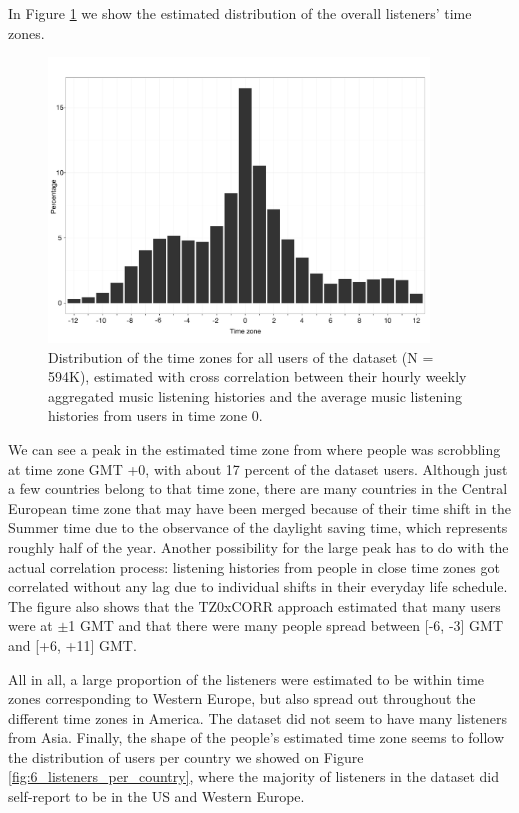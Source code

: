 In Figure \ref{fig:listenerstimezonebytz0weeklycorrelation} we show the estimated distribution of the overall listeners' time zones.	
\begin{figure}[!h]
\centering
\includegraphics[width = 0.9\textwidth]{listeners_tz_xcorr.pdf}
\caption[Distribution of the time zones for all users of the dataset]{Distribution of the time zones for all users of the dataset (N = 594K), estimated with cross correlation between their hourly weekly aggregated music listening histories and the average music listening histories from users in time zone 0.}
\label{fig:listenerstimezonebytz0weeklycorrelation}
\end{figure}
We can see a peak in the estimated time zone from where people was scrobbling at time zone GMT +0, with about 17 percent of the dataset users. Although just a few countries belong to that time zone, there are many countries in the Central European time zone that may have been merged because of their time shift in the Summer time due to the observance of the daylight saving time,  which represents roughly half of the year.
Another possibility for the large peak has to do with the actual correlation process: listening histories from people in close time zones got correlated without any lag due to individual shifts in their everyday life schedule.
The figure also shows that the TZ0xCORR approach estimated that many users were at $\pm$1 GMT and that there were many people spread between [-6, -3] GMT and [+6, +11] GMT. 

All in all, a large proportion of the listeners were estimated to be within time zones corresponding to Western Europe, but also spread out throughout the different time zones in America. The dataset did not seem to have many listeners from Asia. Finally, the shape of the people's estimated time zone seems to follow the distribution of users per country we showed on Figure \ref{fig:6_listeners_per_country}, where the majority of listeners in the dataset did self-report to be in the US and Western Europe.





